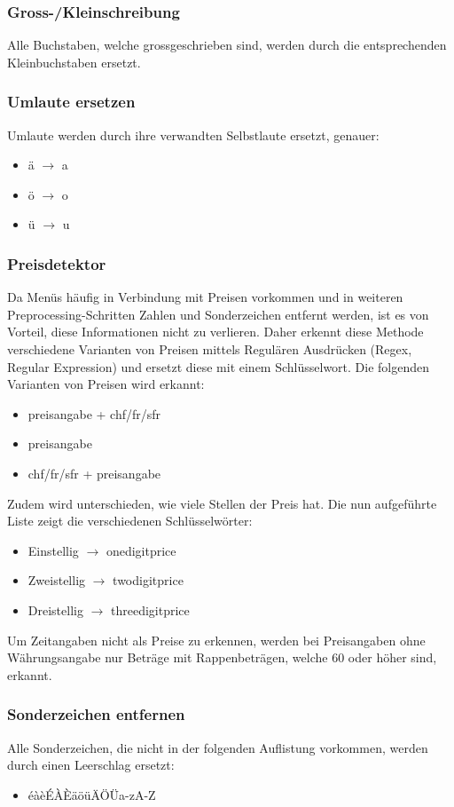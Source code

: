 \subsubsection{Gross-/Kleinschreibung}
Alle Buchstaben, welche grossgeschrieben sind, werden durch die entsprechenden Kleinbuchstaben ersetzt.
\subsubsection{Umlaute ersetzen}
Umlaute werden durch ihre verwandten Selbstlaute ersetzt, genauer:
\begin{itemize}
	\item ä $\rightarrow$ a
	\item ö $\rightarrow$ o
	\item ü $\rightarrow$ u
\end{itemize} 
\subsubsection{Preisdetektor}
Da Menüs häufig in Verbindung mit Preisen vorkommen und in weiteren Preprocessing-Schritten Zahlen und Sonderzeichen entfernt werden, ist es von Vorteil, diese Informationen nicht zu verlieren.
Daher erkennt diese Methode verschiedene Varianten von Preisen mittels Regulären Ausdrücken (Regex, Regular Expression) und ersetzt diese mit einem Schlüsselwort.
Die folgenden Varianten von Preisen wird erkannt:
\begin{itemize}
	\item preisangabe + chf/fr/sfr
	\item preisangabe
	\item chf/fr/sfr + preisangabe
\end{itemize} 
Zudem wird unterschieden, wie viele Stellen der Preis hat.
Die nun aufgeführte Liste zeigt die verschiedenen Schlüsselwörter:
\begin{itemize}
	\item Einstellig $\rightarrow$ onedigitprice
	\item Zweistellig $\rightarrow$ twodigitprice
	\item Dreistellig $\rightarrow$ threedigitprice
\end{itemize} 
Um Zeitangaben nicht als Preise zu erkennen, werden bei Preisangaben ohne Währungsangabe nur Beträge mit Rappenbeträgen, welche 60 oder höher sind, erkannt.
\subsubsection{Sonderzeichen entfernen}
Alle Sonderzeichen, die nicht in der folgenden Auflistung vorkommen, werden durch einen Leerschlag ersetzt:
\begin{itemize}
	\item éàèÉÀÈäöüÄÖÜa-zA-Z
\end{itemize} 
